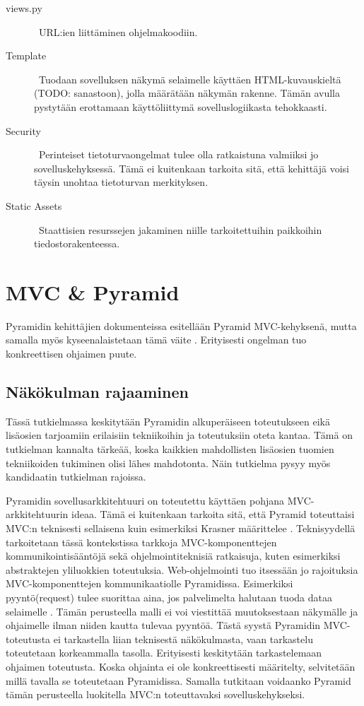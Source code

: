 \documentclass[finnish,utf8,nonumbib,palatino,kandi]{gradu2}
\begin{document}
\begin{description}
\item [views.py] \ URL:ien liittäminen ohjelmakoodiin. 
\item[Template] \ Tuodaan sovelluksen näkymä selaimelle käyttäen HTML-kuvauskieltä (TODO: sanastoon), jolla määrätään näkymän rakenne. Tämän avulla pystytään erottamaan käyttöliittymä sovelluslogiikasta tehokkaasti.
\item[Security] \ Perinteiset tietoturvaongelmat tulee olla ratkaistuna valmiiksi jo sovelluskehyksessä. Tämä ei kuitenkaan tarkoita sitä, että kehittäjä voisi täysin unohtaa tietoturvan merkityksen.
\item[Static Assets] \ Staattisien resurssejen jakaminen niille tarkoitettuihin paikkoihin tiedostorakenteessa.
\end{description}


\section{MVC \& Pyramid}
Pyramidin kehittäjien dokumenteissa esitellään Pyramid MVC-kehyksenä, mutta samalla myös kyseenalaistetaan tämä väite \cite{Pyramid:intr}. Erityisesti ongelman tuo konkreettisen ohjaimen puute.

\subsection{Näkökulman rajaaminen}
Tässä tutkielmassa keskitytään Pyramidin alkuperäiseen toteutukseen eikä lisäosien tarjoamiin erilaisiin tekniikoihin ja toteutuksiin oteta kantaa. Tämä on tutkielman kannalta tärkeää, koska kaikkien
mahdollisten lisäosien tuomien tekniikoiden tukiminen olisi lähes mahdotonta. Näin tutkielma pysyy myös kandidaatin tutkielman rajoissa.

Pyramidin sovellusarkkitehtuuri on toteutettu käyttäen pohjana MVC-arkkitehtuurin ideaa. Tämä ei kuitenkaan tarkoita sitä, että Pyramid toteuttaisi MVC:n teknisesti sellaisena kuin esimerkiksi Krasner määrittelee \cite{Krasner:desc}. Teknisyydellä
tarkoitetaan tässä kontekstissa tarkkoja MVC-komponenttejen kommunikointisääntöjä sekä ohjelmointiteknisiä ratkaisuja, kuten esimerkiksi abstraktejen yliluokkien toteutuksia. Web-ohjelmointi tuo itsessään jo rajoituksia MVC-komponenttejen kommunikaatiolle
Pyramidissa. Esimerkiksi pyyntö(request) tulee suorittaa aina, jos palvelimelta halutaan tuoda dataa selaimelle \cite{Web}. Tämän perusteella malli ei voi viestittää muutoksestaan näkymälle ja ohjaimelle ilman niiden kautta tulevaa pyyntöä. Tästä syystä Pyramidin MVC-toteutusta ei tarkastella liian teknisestä näkökulmasta, vaan
tarkastelu toteutetaan korkeammalla tasolla. Erityisesti keskitytään tarkastelemaan ohjaimen toteutusta. Koska ohjainta ei ole konkreettisesti määritelty, selvitetään millä tavalla se toteutetaan Pyramidissa. Samalla tutkitaan voidaanko Pyramid tämän perusteella luokitella MVC:n toteuttavaksi sovelluskehykseksi.
\end{document}
